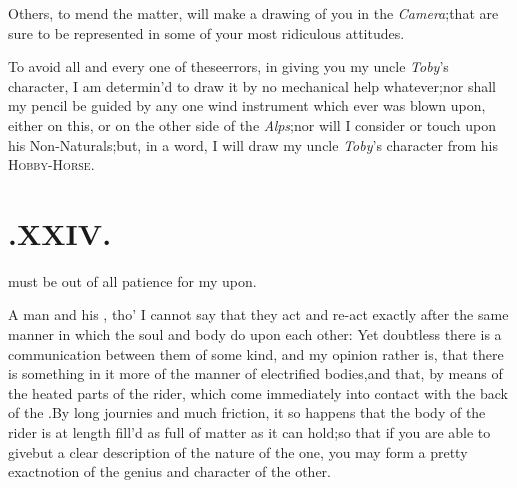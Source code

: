 \documentclass{article}
\begin{document}
Others, to mend the matter, will make a drawing of you in the
\textit{Camera};\tsk  that\break
{}
are sure to be represented in some of your most
ridiculous attitudes.

To avoid all and every one of these\break errors, in giving you my
uncle \textit{Toby}’s character, I am determin’d to draw it
by
no mechanical help whatever;\tsh  nor shall my pencil be guided by
any one wind instrument which ever was blown upon, either on this,
or on the other side of the \textit{Alps};\tsk  nor will I
consider\break
{}
or touch upon his
Non-Naturals;\tsk but, in a word, I will draw my uncle
\textit{Toby}’s character from his
\textsc{Hobby-Horse}.


\null
\section{.\enspace XXIV.}

  must be out of all patience for my\break
{}
\break 
upon.

A man and his ,\break
tho’ I cannot say that they act and re-act exactly after the
same manner in which the soul and body do upon each other: Yet
doubtless there is a communication between them of some kind, and
my\break
opinion rather is, that there is something in it more of the
manner of electrified bodies,\tsk  and that, by means of the
heated parts of the rider, which come immediately into contact with
the back of the .\tsk  By
long journies and much friction, it so happens that the bo\-dy of
the rider is at length fill’d as full of
 matter as it can
hold;\tsk  so that if you are able to give\break but a clear description of the nature
of the one, you may form a pretty exact\break notion of the genius and
character of the other.
\end{document}
